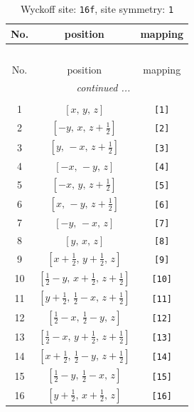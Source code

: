 \documentclass[fleqn,8pt]{jsarticle}
\begin{document}
\begin{longtable}{ccc}
\caption{Wyckoff site: {\tt 16f}, site symmetry: {\tt 1}}
 \\
 \hline \hline
No. & position & mapping \\ \hline \endfirsthead

\multicolumn{2}{l}{\tablename\ \thetable{}} \\
 \hline \hline
No. & position & mapping \\ \hline \endhead

 \hline \hline
\multicolumn{2}{r}{\footnotesize\it continued ...} \\ \endfoot

 \hline \hline
\multicolumn{2}{r}{} \\ \endlastfoot

1 & $\left[ x,\, y,\, z \right]$ & {\tt [1]} \\ \hline
2 & $\left[ - y,\, x,\, z + \frac{1}{2} \right]$ & {\tt [2]} \\ \hline
3 & $\left[ y,\, - x,\, z + \frac{1}{2} \right]$ & {\tt [3]} \\ \hline
4 & $\left[ - x,\, - y,\, z \right]$ & {\tt [4]} \\ \hline
5 & $\left[ - x,\, y,\, z + \frac{1}{2} \right]$ & {\tt [5]} \\ \hline
6 & $\left[ x,\, - y,\, z + \frac{1}{2} \right]$ & {\tt [6]} \\ \hline
7 & $\left[ - y,\, - x,\, z \right]$ & {\tt [7]} \\ \hline
8 & $\left[ y,\, x,\, z \right]$ & {\tt [8]} \\ \hline
9 & $\left[ x + \frac{1}{2},\, y + \frac{1}{2},\, z \right]$ & {\tt [9]} \\ \hline
10 & $\left[ \frac{1}{2} - y,\, x + \frac{1}{2},\, z + \frac{1}{2} \right]$ & {\tt [10]} \\ \hline
11 & $\left[ y + \frac{1}{2},\, \frac{1}{2} - x,\, z + \frac{1}{2} \right]$ & {\tt [11]} \\ \hline
12 & $\left[ \frac{1}{2} - x,\, \frac{1}{2} - y,\, z \right]$ & {\tt [12]} \\ \hline
13 & $\left[ \frac{1}{2} - x,\, y + \frac{1}{2},\, z + \frac{1}{2} \right]$ & {\tt [13]} \\ \hline
14 & $\left[ x + \frac{1}{2},\, \frac{1}{2} - y,\, z + \frac{1}{2} \right]$ & {\tt [14]} \\ \hline
15 & $\left[ \frac{1}{2} - y,\, \frac{1}{2} - x,\, z \right]$ & {\tt [15]} \\ \hline
16 & $\left[ y + \frac{1}{2},\, x + \frac{1}{2},\, z \right]$ & {\tt [16]} \\
\end{longtable}
\end{document}
